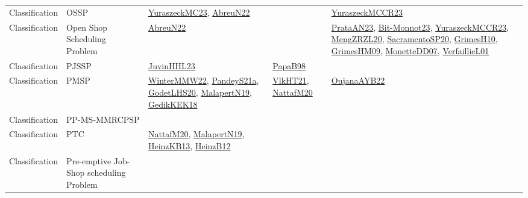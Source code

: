 {\begin{longtable}{lp{3cm}>{\raggedright}p{6cm}>{\raggedright}p{6cm}p{8cm}}
Classification & OSSP & \href{papers/YuraszeckMC23.pdf}{YuraszeckMC23}\cite{YuraszeckMC23}, \href{articles/AbreuN22.pdf}{AbreuN22}\cite{AbreuN22} &  & \href{articles/YuraszeckMCCR23.pdf}{YuraszeckMCCR23}\cite{YuraszeckMCCR23}\\
Classification & Open Shop Scheduling Problem & \href{articles/AbreuN22.pdf}{AbreuN22}\cite{AbreuN22} &  & \href{articles/PrataAN23.pdf}{PrataAN23}\cite{PrataAN23}, \href{papers/Bit-Monnot23.pdf}{Bit-Monnot23}\cite{Bit-Monnot23}, \href{articles/YuraszeckMCCR23.pdf}{YuraszeckMCCR23}\cite{YuraszeckMCCR23}, \href{articles/MengZRZL20.pdf}{MengZRZL20}\cite{MengZRZL20}, \href{articles/SacramentoSP20.pdf}{SacramentoSP20}\cite{SacramentoSP20}, \href{papers/GrimesH10.pdf}{GrimesH10}\cite{GrimesH10}, \href{papers/GrimesHM09.pdf}{GrimesHM09}\cite{GrimesHM09}, \href{papers/MonetteDD07.pdf}{MonetteDD07}\cite{MonetteDD07}, \href{papers/VerfaillieL01.pdf}{VerfaillieL01}\cite{VerfaillieL01}\\
Classification & PJSSP & \href{papers/JuvinHHL23.pdf}{JuvinHHL23}\cite{JuvinHHL23} & \href{articles/PapaB98.pdf}{PapaB98}\cite{PapaB98} & \\
Classification & PMSP & \href{papers/WinterMMW22.pdf}{WinterMMW22}\cite{WinterMMW22}, \href{articles/PandeyS21a.pdf}{PandeyS21a}\cite{PandeyS21a}, \href{papers/GodetLHS20.pdf}{GodetLHS20}\cite{GodetLHS20}, \href{papers/MalapertN19.pdf}{MalapertN19}\cite{MalapertN19}, \href{articles/GedikKEK18.pdf}{GedikKEK18}\cite{GedikKEK18} & \href{articles/VlkHT21.pdf}{VlkHT21}\cite{VlkHT21}, \href{papers/NattafM20.pdf}{NattafM20}\cite{NattafM20} & \href{papers/OujanaAYB22.pdf}{OujanaAYB22}\cite{OujanaAYB22}\\
Classification & PP-MS-MMRCPSP &  &  & \\
Classification & PTC & \href{papers/NattafM20.pdf}{NattafM20}\cite{NattafM20}, \href{papers/MalapertN19.pdf}{MalapertN19}\cite{MalapertN19}, \href{papers/HeinzKB13.pdf}{HeinzKB13}\cite{HeinzKB13}, \href{papers/HeinzB12.pdf}{HeinzB12}\cite{HeinzB12} &  & \\
Classification & Pre-emptive Job-Shop scheduling Problem &  &  & \\

\end{longtable}}
